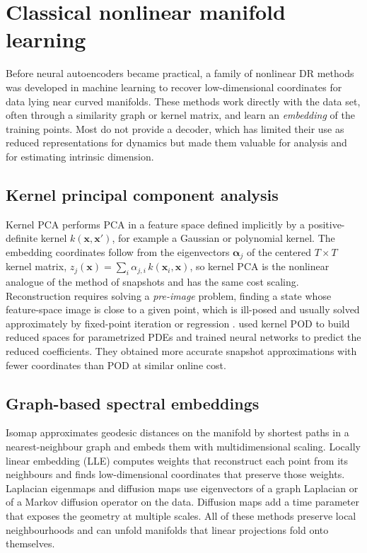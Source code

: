\section{Classical nonlinear manifold learning}
\label{sec:manifold}

Before neural autoencoders became practical, a family of nonlinear DR methods
was developed in machine learning to recover low-dimensional coordinates for
data lying near curved manifolds. These methods work directly with the data
set, often through a similarity graph or kernel matrix, and learn an
\emph{embedding} of the training points. Most do not provide a decoder, which
has limited their use as reduced representations for dynamics but made them
valuable for analysis and for estimating intrinsic dimension.

\subsection{Kernel principal component analysis}

Kernel PCA \parencite{scholkopf1998kpca} performs PCA in a feature space defined
implicitly by a positive-definite kernel $k(\bm{x},\bm{x}')$, for example a
Gaussian or polynomial kernel. The embedding coordinates follow from the
eigenvectors $\bm{\alpha}_j$ of the centered $T\times T$ kernel matrix,
$z_j(\bm{x})=\sum_{i}\alpha_{j,i}\,k(\bm{x}_i,\bm{x})$, so kernel PCA is the
nonlinear analogue of the method of snapshots and has the same cost scaling.
Reconstruction requires solving a \emph{pre-image} problem, finding a state
whose feature-space image is close to a given point, which is ill-posed and
usually solved approximately by fixed-point iteration or regression
\parencite{mika1999preimage}. \textcite{salvador2021kpod} used kernel POD to
build reduced spaces for parametrized PDEs and trained neural networks to
predict the reduced coefficients. They obtained more accurate snapshot
approximations with fewer coordinates than POD at similar online cost.

\subsection{Graph-based spectral embeddings}

Isomap \parencite{tenenbaum2000isomap} approximates geodesic distances on the
manifold by shortest paths in a nearest-neighbour graph and embeds them with
multidimensional scaling. Locally linear embedding (LLE)
\parencite{roweis2000lle} computes weights that reconstruct each point from its
neighbours and finds low-dimensional coordinates that preserve those weights.
Laplacian eigenmaps \parencite{belkin2003laplacian} and diffusion maps
\parencite{coifman2006diffusion} use eigenvectors of a graph Laplacian or of a
Markov diffusion operator on the data. Diffusion maps add a time parameter
that exposes the geometry at multiple scales. All of these methods preserve
local neighbourhoods and can unfold manifolds that linear projections fold
onto themselves.

